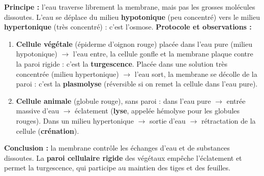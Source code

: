 \documentclass[11pt]{article}
\newcommand{\cle}[1]{{\popxbold\color{popdark}#1}}
\begin{document}
\begin{experience}
\textbf{Principe :} l'eau traverse librement la membrane, mais pas les grosses molécules dissoutes. L'eau se déplace du milieu \textbf{hypotonique} (peu concentré) vers le milieu \textbf{hypertonique} (très concentré) : c'est l'\cle{osmose}.
\textbf{Protocole et observations :}
\begin{enumerate}
    \item \textbf{Cellule végétale} (épiderme d'oignon rouge) placée dans l'eau pure (milieu hypotonique) $\rightarrow$ l'eau entre, la cellule gonfle et la membrane plaque contre la paroi rigide : c'est la \textbf{turgescence}. Placée dans une solution très concentrée (milieu hypertonique) $\rightarrow$ l'eau sort, la membrane se décolle de la paroi : c'est la \textbf{plasmolyse} (réversible si on remet la cellule dans l'eau pure).
    \item \textbf{Cellule animale} (globule rouge), sans paroi : dans l'eau pure $\rightarrow$ entrée massive d'eau $\rightarrow$ éclatement (\textbf{lyse}, appelée hémolyse pour les globules rouges). Dans un milieu hypertonique $\rightarrow$ sortie d'eau $\rightarrow$ rétractation de la cellule (\textbf{crénation}).
\end{enumerate}
\textbf{Conclusion :} la membrane contrôle les échanges d'eau et de substances dissoutes. La \textbf{paroi cellulaire rigide} des végétaux empêche l'éclatement et permet la turgescence, qui participe au maintien des tiges et des feuilles.
\end{experience}
\end{document}
